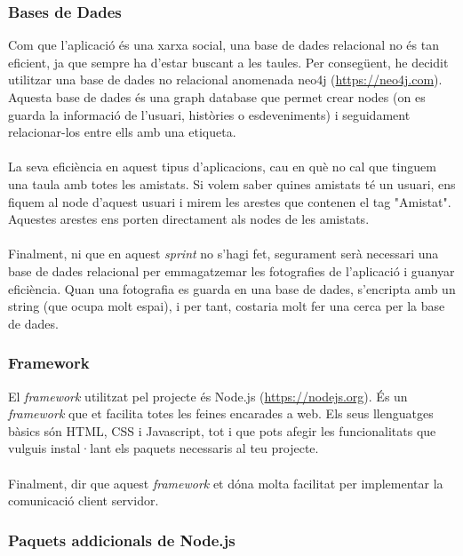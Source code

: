 \documentclass[11pt,catalan,listoffigures,listoftables]{tfgetsinf}
\begin{document}
\subsubsection{Bases de Dades}

Com que l'aplicació és una xarxa social, una base de dades relacional no és tan eficient, ja que sempre ha d'estar buscant a les taules. Per consegüent, he decidit utilitzar una base de dades no relacional anomenada neo4j (\url{https://neo4j.com}). Aquesta base de dades és una graph database que permet crear nodes (on es guarda la informació de l'usuari, històries o esdeveniments) i seguidament relacionar-los entre ells amb una etiqueta. \\ \\
La seva eficiència en aquest tipus d'aplicacions, cau en què no cal que tinguem una taula amb totes les amistats. Si volem saber quines amistats té un usuari, ens fiquem al node d'aquest usuari i mirem les arestes que contenen el tag "Amistat". Aquestes arestes ens porten directament als nodes de les amistats.\\ \\
Finalment, ni que en aquest \textit{sprint} no s'hagi fet, segurament serà necessari una base de dades relacional per emmagatzemar les fotografies de l'aplicació i guanyar eficiència. Quan una fotografia es guarda en una base de dades, s'encripta amb un string (que ocupa molt espai), i per tant, costaria molt fer una cerca per la base de dades.

\subsubsection{Framework}

El \textit{framework} utilitzat pel projecte és Node.js (\url{https://nodejs.org}). És un \textit{framework} que et facilita totes les feines encarades a web. Els seus llenguatges bàsics són HTML, CSS i Javascript, tot i que pots afegir les funcionalitats que vulguis instal·lant els paquets necessaris al teu projecte.\\ \\
Finalment, dir que aquest \textit{framework} et dóna molta facilitat per implementar la comunicació client servidor.

\subsubsection{Paquets addicionals de Node.js}
\end{document}
